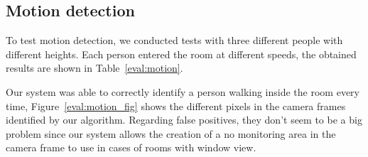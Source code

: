 


\subsection{Motion detection}

To test motion detection, we conducted tests with three different people with different heights. Each person entered the room at different speeds, the obtained results are shown in Table~\ref{eval:motion}.

Our system was able to correctly identify a person walking inside the room every time, Figure~\ref{eval:motion_fig} shows the different pixels in the camera frames identified by our algorithm. Regarding false positives, they don't seem to be a big problem since our system allows the creation of a no monitoring area in the camera frame to use in cases of rooms with window view.


